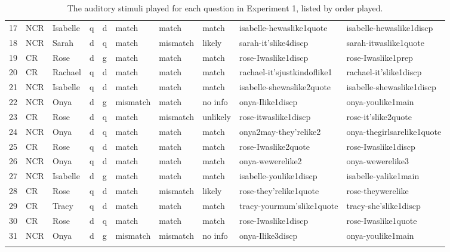 \begin{sidewaystable}[htbp]
\begin{center}
{\begin{tabular}{llllllllll}
17 & NCR & Isabelle & q & d & match & match & match & isabelle-hewaslike1quote & isabelle-hewaslike1discp \\
18 & NCR & Sarah & d & q & match & mismatch & likely & sarah-it'slike4discp	& sarah-itwaslike1quote \\
19 & CR	& Rose	& d & g & match &	match &	match &	rose-Iwaslike1discp & rose-Iwaslike1prep \\
20 & CR & Rachael & q & d & match &	match &	match &	rachael-it'sjustkindoflike1	& rachael-it'slike1discp \\
21 & NCR & Isabelle & q & d & match	& match	& match	& isabelle-shewaslike2quote	& isabelle-shewaslike1discp \\
22 & NCR & Onya & d & g &	mismatch & match & no info & onya-Ilike1discp	& onya-youlike1main  \\
23 & CR	& Rose	& d & q &	match &	mismatch & unlikely &	rose-itwaslike1discp &	rose-it'slike2quote \\
24 & NCR & Onya &	d &	q &	match &	match &	match	& onya2may-they'relike2	& onya-thegirlsarelike1quote \\
25 & CR	& Rose &	q &	d & match &	match &	match &	rose-Iwaslike2quote &	rose-Iwaslike1discp \\
26 & NCR & Onya &	q	& d &	match	& match	& match	& onya-wewerelike2 & onya-wewerelike3 \\
27 & NCR & Isabelle &	d &	g &	match	& match &	match &	isabelle-youlike1discp & isabelle-yalike1main \\
28 & CR &	Rose &	q &	d & match &	mismatch & likely &	rose-they'relike1quote	& rose-theywerelike \\
29 & CR & Tracy &	q	& d & match &	match &	match &	tracy-yourmum'slike1quote &	tracy-she'slike1discp \\
30 & CR &	Rose &	d &	q	& match	& match	& match	& rose-Iwaslike1discp & rose-Iwaslike1quote \\
31 & NCR & Onya	& d &	g	& mismatch & mismatch	& no info &	onya-Ilike3discp & onya-youlike1main \\ 
   \lspbottomrule 
\end{tabular}
}
\caption{The auditory stimuli played for each question in Experiment 1, listed by order played.}\label{tab:appenExp1stimuli}
\end{center}
\end{sidewaystable}	

\clearpage

